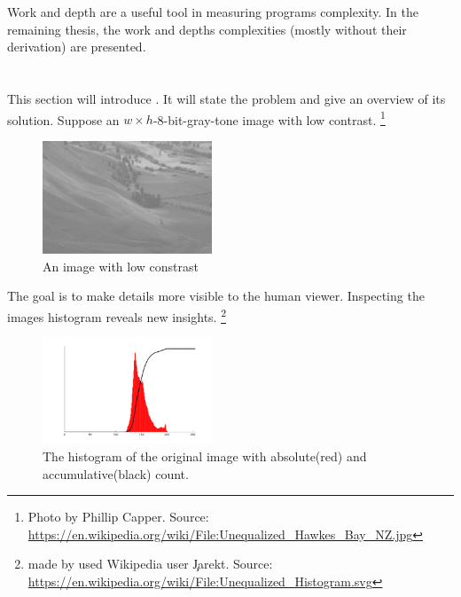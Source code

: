   Work and depth are a useful tool in measuring
  programs complexity. In the remaining thesis,
  the work and depths complexities (mostly without their derivation)
  are presented.
   
\section{\algo}
  \label{section:hbalanceintro}
  This section will introduce \algo. It will state the problem and give an overview of its solution.
  Suppose an $w \times h$-8-bit-gray-tone image with low contrast.
  \footnote{Photo by Phillip Capper. Source: \url{https://en.wikipedia.org/wiki/File:Unequalized_Hawkes_Bay_NZ.jpg}}
      
      \begin{figure}[h]
        \centering
        \includegraphics[width=0.45\textwidth]{img-org}
        \caption{An image with low constrast}
        \label{fig:img-org}
      \end{figure}
      The goal is to make details more visible to the human viewer.
      Inspecting the images histogram reveals new insights.
      \footnote{made by used Wikipedia user \c{Jarekt}. Source: \url{https://en.wikipedia.org/wiki/File:Unequalized_Histogram.svg}}
      
      \begin{figure}[h]
        \centering
        \includegraphics[width=0.45\textwidth]{hist-org}
        \caption{The histogram of the original image with absolute(red) and accumulative(black) count.}
        \label{fig:hist-org}
      \end{figure}
      
